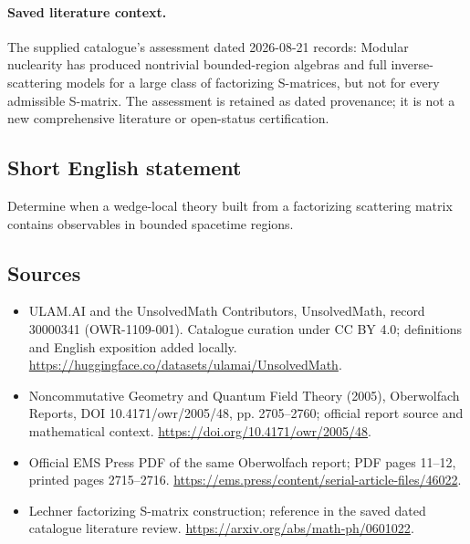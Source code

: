 \documentclass[11pt]{article}
\begin{document}
\paragraph{Saved literature context.} The supplied catalogue's assessment dated 2026-08-21 records: Modular nuclearity has produced nontrivial bounded-region algebras and full inverse-scattering models for a large class of factorizing S-matrices, but not for every admissible S-matrix. The assessment is retained as dated provenance; it is not a new comprehensive literature or open-status certification.
\subsection{Short English statement}
Determine when a wedge-local theory built from a factorizing scattering matrix contains observables in bounded spacetime regions.
\subsection{Sources}
\begin{itemize}
\item[\hypertarget{source:30000341:1}{S1}] ULAM.AI and the UnsolvedMath Contributors, UnsolvedMath, record 30000341 (OWR-1109-001). Catalogue curation under CC BY 4.0; definitions and English exposition added locally.
\url{https://huggingface.co/datasets/ulamai/UnsolvedMath}.
\item[\hypertarget{source:30000341:2}{S2}] Noncommutative Geometry and Quantum Field Theory (2005), Oberwolfach Reports, DOI 10.4171/owr/2005/48, pp. 2705--2760; official report source and mathematical context.
\url{https://doi.org/10.4171/owr/2005/48}.
\item[\hypertarget{source:30000341:3}{S3}] Official EMS Press PDF of the same Oberwolfach report; PDF pages 11--12, printed pages 2715--2716.
\url{https://ems.press/content/serial-article-files/46022}.
\item[\hypertarget{source:30000341:4}{S4}] Lechner factorizing S-matrix construction; reference in the saved dated catalogue literature review.
\url{https://arxiv.org/abs/math-ph/0601022}.
\end{itemize}
\label{end:30000341}
\end{document}
